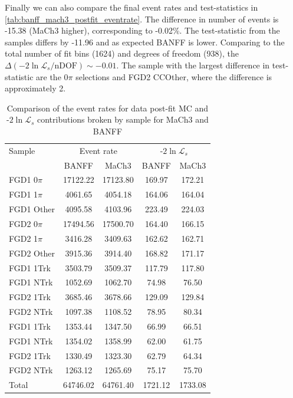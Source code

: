 Finally we can also compare the final event rates and test-statistics in \autoref{tab:banff_mach3_postfit_eventrate}. The difference in number of events is -15.38 (MaCh3 higher), corresponding to -0.02\%. The test-statistic from the samples differs by -11.96 and as expected BANFF is lower. Comparing to the total number of fit bins (1624) and degrees of freedom (938), the $\Delta\left(-2\ln\mathcal{L}_s/\text{nDOF}\right) \sim -0.01$. The sample with the largest difference in test-statistic are the 0$\pi$ selections and FGD2 CCOther, where the difference is approximately 2.
\begin{table}[h]
	\centering 
	\begin{tabular}{ l | c c | c c }
		\hline
		\hline
		Sample 		& \multicolumn{2}{c|}{Event rate} & \multicolumn{2}{c}{-$2\ln{\mathcal{L}}_{s}$} \\
		& BANFF         & MaCh3    & BANFF    & MaCh3 \\
		\hline
		FGD1 0$\pi$ 	& 17122.22 	& 17123.80 & 169.97   & 172.21 	\\ 
		FGD1 1$\pi$ 	& 4061.65 	& 4054.18  & 164.06   & 164.04 	\\ 
		FGD1 Other 	& 4095.58 	& 4103.96  & 223.49   & 224.03 	\\ 
		\hline
		FGD2 0$\pi$ 	& 17494.56 	& 17500.70 & 164.40   & 166.15 	\\ 
		FGD2 1$\pi$ 	& 3416.28 	& 3409.63  & 162.62   & 162.71 	\\ 
		FGD2 Other 	& 3915.36 	& 3914.40  & 168.82   & 171.17 	\\ 
		\hline
		FGD1 1Trk 	& 3503.79 	& 3509.37  & 117.79   & 117.80 	\\ 
		FGD1 NTrk 	& 1052.69 	& 1062.70  & 74.98    & 76.50 	\\ 
		FGD2 1Trk 	& 3685.46  	& 3678.66  & 129.09   & 129.84 	\\ 
		FGD2 NTrk 	& 1097.38	& 1108.52  & 78.95    & 80.34 	\\ 
		\hline
		FGD1 1Trk 	& 1353.44 	& 1347.50  & 66.99    & 66.51 	\\ 
		FGD1 NTrk 	& 1354.02 	& 1358.99  & 62.00    & 61.75 	\\ 
		FGD2 1Trk 	& 1330.49 	& 1323.30  & 62.79    & 64.34 	\\ 
		FGD2 NTrk 	& 1263.12 	& 1265.69  & 75.17    & 75.70 	\\ 
		\hline
		Total 		& 64746.02      & 64761.40 & 1721.12  & 1733.08 	\\ 
		\hline
		\hline
	\end{tabular}
	\caption{Comparison of the event rates for data post-fit MC and -$2\ln{\mathcal{L}}_{s}$ contributions broken by sample for MaCh3 and BANFF}
	\label{tab:banff_mach3_postfit_eventrate}
\end{table}

